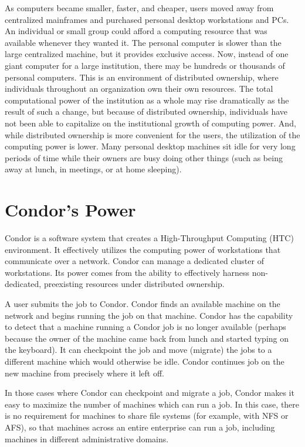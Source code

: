 As computers became smaller, faster, and cheaper, 
users moved away from centralized mainframes and purchased personal desktop
workstations and PCs.
An individual or small group could afford a
computing resource that was available whenever they wanted it.
The personal computer is slower than the large centralized machine,
but it provides exclusive access.
Now, instead of one giant computer for a large institution,
there may be hundreds or thousands of personal computers.
This is an environment of distributed ownership,
where individuals throughout an organization own their own resources.
The total computational power of the institution as a whole may rise
dramatically as the result of such a change,
but because of distributed ownership,
individuals have not been able to capitalize on the institutional growth of
computing power.
And, while distributed ownership is more convenient for the users,
the utilization of the computing power is lower.
Many personal desktop
machines sit idle for very long periods of time while their owners are
busy doing other things (such as being away at lunch, in meetings,
or at home sleeping). 

\section{\label{sec:what-is-condor}Condor's Power}

Condor is a software system that creates a High-Throughput Computing
(HTC) environment.
It effectively utilizes the computing power of workstations that
communicate over a network.
Condor can manage a dedicated cluster of workstations.
Its power comes from the
ability to effectively harness non-dedicated,
preexisting resources under distributed ownership. 

A user submits the job to Condor.
Condor finds an available machine on the network and begins
running the job on that machine.
Condor has the capability to detect that a machine running a Condor job
is no longer available (perhaps because the owner of the machine
came back from lunch and started typing on the keyboard).
It can checkpoint 
the job and move (migrate)
the jobs to a different machine which would otherwise be idle.
Condor continues job on the new machine from
precisely where it left off.

In those cases where Condor can checkpoint and migrate a job,
Condor makes it easy to maximize the number of machines which can run
a job.
In this case, there is no requirement for machines to
share file systems (for example, with NFS or AFS),
so that machines across an entire enterprise can run a job,
including machines in different administrative domains.

